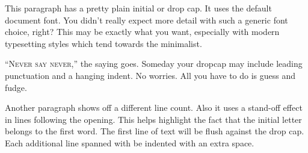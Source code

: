\documentclass{article}
\begin{document}
\lettrine[nindent=0sp]{T}{}his paragraph has a pretty plain initial or drop cap.
It uses the default document font.
You didn’t really expect more detail with such a generic font choice, right?
This may be exactly what you want, especially with modern typesetting styles which tend towards the minimalist.

\lettrine[lhang=.4,nindent=0sp]{“N}{ever say never,}” the saying goes.
Someday your dropcap may include leading punctuation {and} a hanging indent.
No worries.
All you have to do is guess and fudge.

\lettrine[lines=3,nindent=1em]{A}{}nother paragraph shows off a different line count.
Also it uses a stand-off effect in lines following the opening.
This helps highlight the fact that the initial letter belongs to the first word.
The first line of text will be flush against the drop cap.
Each additional line spanned with be indented with an extra space.
\end{document}
